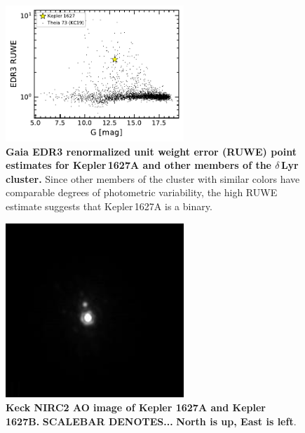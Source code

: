 \documentclass[12pt,modern,tighten]{aastex63}
\begin{document}
\begin{figure}[t]
	\begin{center}
		\leavevmode
		\includegraphics[width=0.6\textwidth]{f6.pdf}
	\end{center}
	\vspace{-0.7cm}
	\caption{
    {\bf Gaia EDR3 renormalized unit weight error (RUWE) point
    estimates for Kepler\,1627A and other members of
    the $\delta$\,Lyr cluster.}  Since other members of the cluster
    with similar colors have comparable degrees of photometric
    variability, the high RUWE estimate suggests that Kepler\,1627A is
    a binary. 
		\label{fig:ruwe}
	}
\end{figure}

\begin{figure}[t]
	\begin{center}
		\leavevmode
		\includegraphics[width=0.6\textwidth]{TEMP_binarity_ao.png}
	\end{center}
	\vspace{-0.7cm}
	\caption{
    {\bf Keck NIRC2 AO image of Kepler 1627A and Kepler 1627B.}  
    {\bf SCALEBAR DENOTES...}
    {\bf North is up, East is left}.
    \label{fig:ao}
	}
\end{figure}
\end{document}
